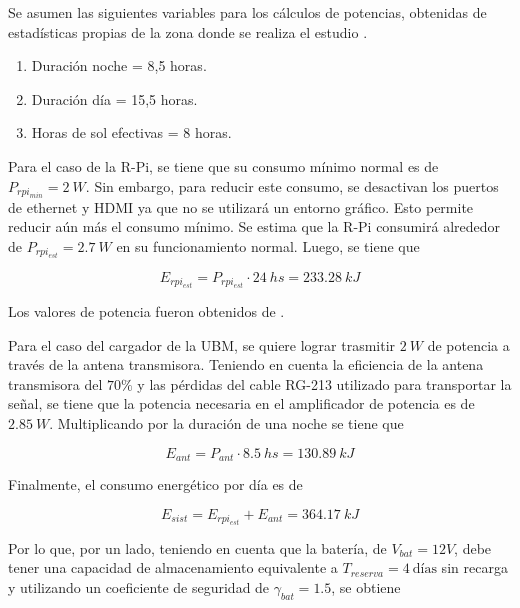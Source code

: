 
Se asumen las siguientes variables para los cálculos de potencias, obtenidas de estadísticas propias de la zona donde se realiza el estudio .
\begin{enumerate}
	\item Duración noche = 8,5 horas.
	\item Duración día = 15,5 horas.
	\item Horas de sol efectivas = 8 horas.
\end{enumerate}

Para el caso de la R-Pi, se tiene que su consumo mínimo normal es de $P_{rpi_{min}} = 2 \ W$. Sin embargo, para reducir este consumo, se desactivan los puertos de ethernet y HDMI ya que no se utilizará un entorno gráfico. Esto permite reducir aún más el consumo mínimo. Se estima  que la R-Pi consumirá alrededor de $P_{rpi_{est}} = 2.7 \ W$ en su funcionamiento normal.
Luego, se tiene que

\begin{equation}
E_{rpi_{est}} = P_{rpi_{est}}\cdot 24 \ hs = 233.28 \ kJ
\end{equation}

Los valores de potencia fueron obtenidos de .

Para el caso del cargador de la UBM, se quiere lograr trasmitir $2 \ W$ de potencia a través de la antena transmisora. Teniendo en cuenta la eficiencia de la antena transmisora del $70\%$ \tbc y las pérdidas del cable RG-213 utilizado para transportar la señal, se tiene que la potencia necesaria en el amplificador de potencia es de $2.85 \ W$. Multiplicando por la duración de una noche se tiene que

\begin{equation}
E_{ant} = P_{ant}\cdot 8.5 \ hs = 130.89 \ kJ
\end{equation}

Finalmente, el consumo energético por día es de

\begin{equation}
E_{sist} = E_{rpi_{est}} + E_{ant} = 364.17 \ kJ
\end{equation}

Por lo que, por un lado, teniendo en cuenta que la batería, de $V_{bat} = 12V$, debe tener una capacidad de almacenamiento equivalente a $T_{reserva} = 4 \ \text{días}$ sin recarga  y utilizando un coeficiente de seguridad de $\gamma_{bat} = 1.5$, se obtiene

